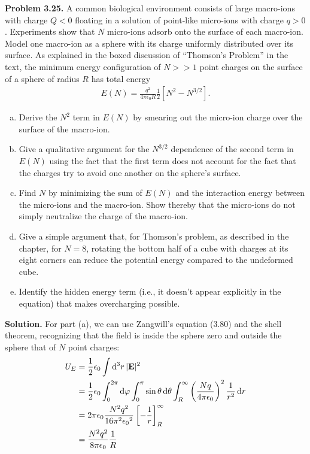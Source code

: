 \documentclass{article}
\begin{document}
\textbf{Problem 3.25.} A common biological environment consists of large macro-ions with charge $Q < 0$ floating in a solution of point-like micro-ions with charge $q > 0$. Experiments show that $N$ micro-ions adsorb onto the surface of each macro-ion. Model one macro-ion as a sphere with its charge uniformly distributed over its surface. As explained in the boxed discussion of “Thomson’s Problem” in the text, the minimum energy configuration of $N >\!\! > 1$ point charges on the surface of a sphere of radius $R$ has total energy
\[
\begin{aligned}
	E(N) = \frac{q^2}{4\pi\epsilon _0 R}\frac{1}{2}\left[N^2 - N^{3/2}\right].
\end{aligned}
\]


\begin{enumerate}[(a)]
\item Derive the $N^2$ term in $E(N)$ by smearing out the micro-ion charge over the surface of the macro-ion.
\item Give a qualitative argument for the $N^{3/2}$ dependence of the second term in $E(N)$ using the fact that the first term does not account for the fact that the charges try to avoid one another on the sphere’s surface.
\item Find $N$ by minimizing the sum of $E(N)$ and the interaction energy between the micro-ions and the macro-ion. Show thereby that the micro-ions do not simply neutralize the charge of the macro-ion.
\item Give a simple argument that, for Thomson's problem, as described in the chapter, for $N=8$, rotating the bottom half of a cube with charges at its eight corners can reduce the potential energy compared to the undeformed cube.
\item Identify the hidden energy term (i.e., it doesn't appear explicitly in the equation) that makes overcharging possible.
\end{enumerate}

\textbf{Solution.} For part (a), we can use Zangwill's equation (3.80) and the shell theorem, recognizing that the field is inside the sphere zero and outside the sphere that of $N$ point charges:
\[
\begin{aligned}
	U_E &= \frac{1}{2}\epsilon_0\int\dd[3]{r} |\vb{E}|^2 \\
	&= \frac{1}{2}\epsilon_0 \int_0^{2\pi} \dd{\varphi} \int_0^\pi \sin\theta\dd{\theta} \int_R^{\infty} \left(\frac{Nq}{4\pi\epsilon_0}\right)^2 \frac{1}{r^2}\dd{r} \\
	&= 2\pi\epsilon_0\frac{N^2 q^2}{16\pi^2{\epsilon_0}^2}\left[-\frac{1}{r}\right]_R^\infty \\
	&= \frac{N^2 q^2}{8\pi\epsilon_0}\frac{1}{R}
\end{aligned}
\]
\end{document}
